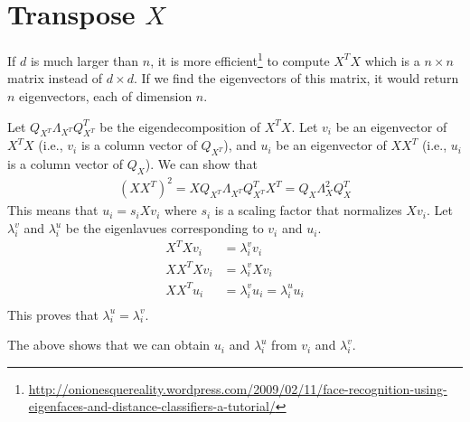 \section{Transpose $X$}
If $d$ is much larger than $n$, it is more
efficient\footnote{\url{http://onionesquereality.wordpress.com/2009/02/11/face-recognition-using-eigenfaces-and-distance-classifiers-a-tutorial/}}
to compute $X^TX$ which is a $n\times n$ matrix instead of $d\times d$. If we find the eigenvectors of this matrix, it would return $n$ eigenvectors, each of dimension $n$.

Let $Q_{X^T}\Lambda_{X^T}Q_{X^T}^T$ be the eigendecomposition of $X^TX$. Let
$v_i$ be an eigenvector of $X^TX$ (i.e., $v_i$ is a column vector of $Q_{X^T}$),
and $u_i$ be an eigenvector of $XX^T$ (i.e., $u_i$ is a column vector of
$Q_{X}$). We can show that
\begin{align*}
(XX^T)^2  = XQ_{X^T}\Lambda_{X^T}Q_{X^T}^TX^T = Q_X\Lambda_X^2 Q_X^T
\end{align*}
This means that $u_i = s_iXv_i$ where $s_i$ is a scaling factor that normalizes
$Xv_i$. Let $\lambda_i^v$ and $\lambda_i^u$ be the eigenlavues corresponding to
$v_i$ and $u_i$.
\begin{align*}
X^TXv_i &= \lambda_i^v v_i \\
XX^TXv_i &= \lambda_i^v Xv_i \\
XX^Tu_i &= \lambda_i^v u_i = \lambda_i^u u_i\\
\end{align*}
This proves that $\lambda_i^u = \lambda_i^v$.

The above shows that we can obtain $u_i$ and $\lambda_i^u$ from $v_i$ and
$\lambda_i^v$.

